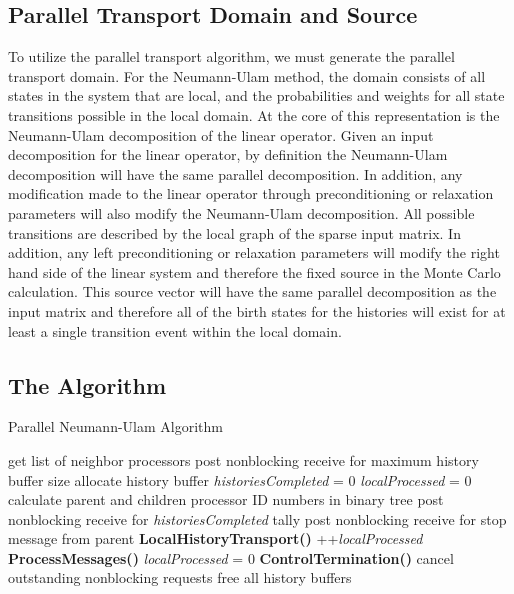 \subsection{Parallel Transport Domain and Source }
\label{subsec:domain_generation}
To utilize the parallel transport algorithm, we must generate the
parallel transport domain. For the Neumann-Ulam method, the domain
consists of all states in the system that are local, and the
probabilities and weights for all state transitions possible in the
local domain. At the core of this representation is the Neumann-Ulam
decomposition of the linear operator. Given an input decomposition for
the linear operator, by definition the Neumann-Ulam decomposition will
have the same parallel decomposition. In addition, any modification
made to the linear operator through preconditioning or relaxation
parameters will also modify the Neumann-Ulam decomposition. All
possible transitions are described by the local graph of the sparse
input matrix. In addition, any left preconditioning or relaxation
parameters will modify the right hand side of the linear system and
therefore the fixed source in the Monte Carlo calculation. This source
vector will have the same parallel decomposition as the input matrix
and therefore all of the birth states for the histories will exist for
at least a single transition event within the local domain.

\clearpage

\subsection{The Algorithm}
\label{subsec:parallel_mc_algorithm}

\begin{algorithm}[h!]
  \caption{Parallel Neumann-Ulam Algorithm}
  \label{alg:parallel_mc_algorithm}
  \begin{algorithmic}[1]
    \State get list of neighbor processors 
    \State post nonblocking receive for maximum history buffer size
    \State allocate history buffer
    \EndFor
    \State \textit{historiesCompleted} = 0
    \State \textit{localProcessed} = 0
    \State calculate parent and children processor ID numbers in
    binary tree
    \State post nonblocking receive for \textit{historiesCompleted} tally
    \EndFor
    \State post nonblocking receive for stop message from parent
    \State \textbf{LocalHistoryTransport()}
    \State ++\textit{localProcessed}
    \EndIf
    \State \textbf{ProcessMessages()}
    \State \textit{localProcessed} = 0
    \EndIf
    \State \textbf{ControlTermination()}
    \EndIf
    \EndWhile
    \State cancel outstanding nonblocking requests
    \State free all history buffers
  \end{algorithmic}
\end{algorithm}

